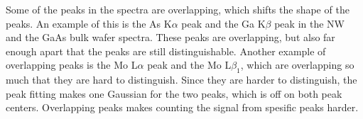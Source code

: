 Some of the peaks in the spectra are overlapping, which shifts the shape of the peaks.
An example of this is the As K$\alpha$ peak and the Ga K$\beta$ peak in the NW and the GaAs bulk wafer spectra.
These peaks are overlapping, but also far enough apart that the peaks are still distinguishable.
Another example of overlapping peaks is the Mo L$\alpha$ peak and the Mo L$\beta_1$, which are overlapping so much that they are hard to distinguish.
Since they are harder to distinguish, the peak fitting makes one Gaussian for the two peaks, which is off on both peak centers. %
Overlapping peaks makes counting the signal from spesific peaks harder.


